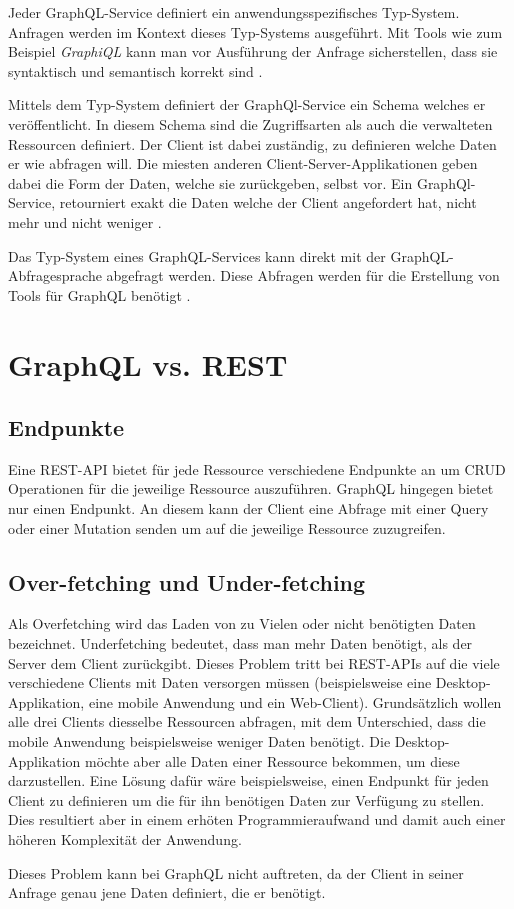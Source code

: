 Jeder GraphQL-Service definiert ein anwendungsspezifisches Typ-System.
Anfragen werden im Kontext dieses Typ-Systems ausgeführt.
Mit Tools wie zum Beispiel \textit{GraphiQL} kann man vor Ausführung der Anfrage sicherstellen, dass sie syntaktisch und semantisch korrekt sind \cite[Abs. 1]{graphqlOnline}.

Mittels dem Typ-System definiert der GraphQl-Service ein Schema welches er veröffentlicht.
In diesem Schema sind die Zugriffsarten als auch die verwalteten Ressourcen definiert.
Der Client ist dabei zuständig, zu definieren welche Daten er wie abfragen will.
Die miesten anderen Client-Server-Applikationen geben dabei die Form der Daten, welche sie zurückgeben, selbst vor.
Ein GraphQl-Service, retourniert exakt die Daten welche der Client angefordert hat, nicht mehr und nicht weniger \cite[Abs. 1]{graphqlOnline}.

Das Typ-System eines GraphQL-Services kann direkt mit der GraphQL-Abfragesprache abgefragt werden. Diese Abfragen werden für die Erstellung von Tools für GraphQL benötigt \cite[Abs. 1]{graphqlOnline}.

\section{GraphQL vs. REST}
\subsection{Endpunkte}
Eine REST-API bietet für jede Ressource verschiedene Endpunkte an um CRUD Operationen für die jeweilige Ressource auszuführen. GraphQL hingegen bietet nur einen
Endpunkt. An diesem kann der Client eine Abfrage mit einer Query oder einer Mutation senden um auf die jeweilige Ressource zuzugreifen.

\subsection{Over-fetching und Under-fetching}
Als Overfetching wird das Laden von zu Vielen oder nicht benötigten Daten bezeichnet.
Underfetching bedeutet, dass man mehr Daten benötigt, als der Server dem Client zurückgibt.
Dieses Problem tritt bei REST-APIs auf die viele verschiedene Clients mit Daten versorgen müssen (beispielsweise eine Desktop-Applikation, eine mobile Anwendung und ein Web-Client).
Grundsätzlich wollen alle drei Clients diesselbe Ressourcen abfragen, mit dem Unterschied, dass die mobile Anwendung beispielsweise weniger Daten benötigt.
Die Desktop-Applikation möchte aber alle Daten einer Ressource bekommen, um diese darzustellen.
Eine Lösung dafür wäre beispielsweise, einen Endpunkt für jeden Client zu definieren um die für ihn benötigen Daten zur Verfügung zu stellen.
Dies resultiert aber in einem erhöten Programmieraufwand und damit auch einer höheren Komplexität der Anwendung.
\newline

Dieses Problem kann bei GraphQL nicht auftreten, da der Client in seiner Anfrage genau jene Daten definiert, die er benötigt.